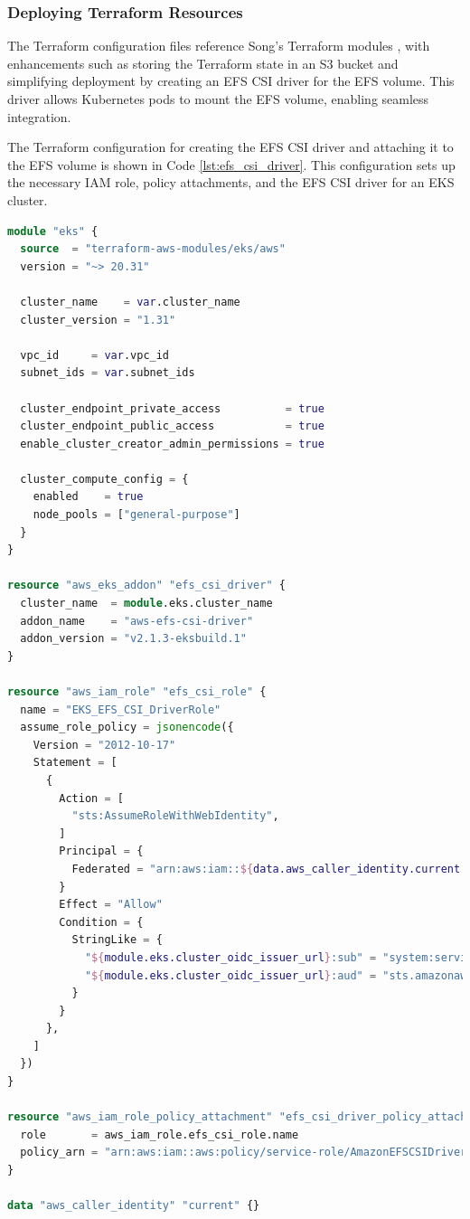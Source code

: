 \subsubsection{Deploying Terraform Resources}
The Terraform configuration files reference Song's Terraform modules \cite{song_yu}, with enhancements such as storing the Terraform state in an S3 bucket and simplifying deployment by creating an EFS CSI driver for the EFS volume. This driver allows Kubernetes pods to mount the EFS volume, enabling seamless integration.

The Terraform configuration for creating the EFS CSI driver and attaching it to the EFS volume is shown in Code \ref{lst:efs_csi_driver}. This configuration sets up the necessary IAM role, policy attachments, and the EFS CSI driver for an EKS cluster.

\begin{lstlisting}[language=Terraform, caption={Terraform Configuration for Creating EFS CSI Driver}, label={lst:efs_csi_driver},breaklines=true]
module "eks" {
  source  = "terraform-aws-modules/eks/aws"
  version = "~> 20.31"

  cluster_name    = var.cluster_name
  cluster_version = "1.31"

  vpc_id     = var.vpc_id
  subnet_ids = var.subnet_ids

  cluster_endpoint_private_access          = true
  cluster_endpoint_public_access           = true
  enable_cluster_creator_admin_permissions = true

  cluster_compute_config = {
    enabled    = true
    node_pools = ["general-purpose"]
  }
}

resource "aws_eks_addon" "efs_csi_driver" {
  cluster_name  = module.eks.cluster_name
  addon_name    = "aws-efs-csi-driver"
  addon_version = "v2.1.3-eksbuild.1"
}

resource "aws_iam_role" "efs_csi_role" {
  name = "EKS_EFS_CSI_DriverRole"
  assume_role_policy = jsonencode({
    Version = "2012-10-17"
    Statement = [
      {
        Action = [
          "sts:AssumeRoleWithWebIdentity",
        ]
        Principal = {
          Federated = "arn:aws:iam::${data.aws_caller_identity.current.account_id}: oidc-provider/${module.eks.cluster_oidc_issuer_url}"
        }
        Effect = "Allow"
        Condition = {
          StringLike = {
            "${module.eks.cluster_oidc_issuer_url}:sub" = "system:serviceaccount:kube-system:efs-csi-*",
            "${module.eks.cluster_oidc_issuer_url}:aud" = "sts.amazonaws.com"
          }
        }
      },
    ]
  })
}

resource "aws_iam_role_policy_attachment" "efs_csi_driver_policy_attachment" {
  role       = aws_iam_role.efs_csi_role.name
  policy_arn = "arn:aws:iam::aws:policy/service-role/AmazonEFSCSIDriverPolicy"
}

data "aws_caller_identity" "current" {}
\end{lstlisting}

